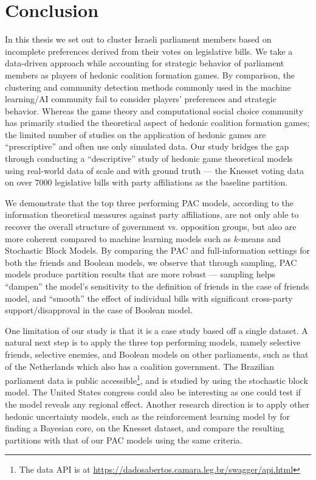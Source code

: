 \chapter{Conclusion}
\label{ch:concl}

In this thesis we set out to cluster Israeli parliament members
based on incomplete preferences derived from their votes on legislative bills.
We take a data-driven approach while accounting for strategic behavior of
parliament members as players of hedonic coalition formation games.
By comparison, the clustering and community detection methods commonly used in
the machine learning/AI community fail to consider players' preferences and
strategic behavior.
Whereas the game theory and computational social choice community has primarily
studied the theoretical aspect of hedonic coalition formation games;
the limited number of studies on the application of hedonic games are
``prescriptive'' and often use only simulated data.
Our study bridges the gap through conducting a ``descriptive'' study of hedonic
game theoretical models using real-world data of scale and with ground truth ---
the Knesset voting data on over 7000 legislative bills with party affiliations as
the baseline partition.

We demonstrate that the top three performing PAC models, according to the
information theoretical measures against party affiliations, are not only able
to recover the overall structure of government vs. opposition groups, but also
are more coherent compared to machine learning models such as $k$-means and
Stochastic Block Models.
By comparing the PAC and full-information settings for both the friends
and Boolean models, we observe that through sampling, PAC models produce
partition results that are more robust --- sampling helps ``dampen'' the
model's sensitivity to the definition of friends in the case of friends model,
and ``smooth'' the effect of individual bills with significant cross-party
support/disapproval in the case of Boolean model.

One limitation of our study is that it is a case study based off a single
dataset.
A natural next step is to apply the three top performing models, namely
selective friends, selective enemies, and Boolean models on other parliaments,
such as that of the Netherlands which also has a coalition government.
The Brazilian parliament data is public accessible\footnote{The data API is at
\url{https://dadosabertos.camara.leg.br/swagger/api.html}}, and is studied by
 using the stochastic block model.
The United States congress could also be interesting as one could test if the
model reveals any regional effect.
Another research direction is to apply other hedonic uncertainty models, such
as the reinforcement learning model by  for
finding a Bayesian core, on the Knesset dataset, and compare the resulting
partitions with that of our PAC models using the same criteria.
